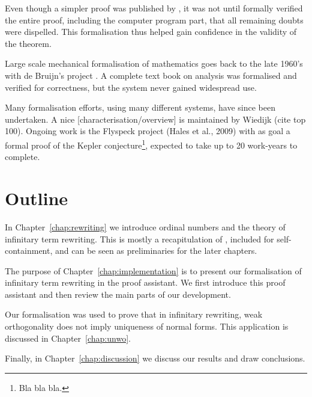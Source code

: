 Even though a simpler proof was published by \citet{robertson-97}, it
was not until \citet{gonthier-05} formally verified the entire proof,
including the computer program part, that all remaining doubts were
dispelled. This formalisation thus helped gain confidence in the
validity of the theorem.

Large scale mechanical formalisation of mathematics goes back to the
late 1960's with de Bruijn's \Automath project
\citep{nederpelt-94}. A complete text book on analysis
\citep{landau-65} was formalised and verified for correctness, but the
system never gained widespread use.

Many formalisation efforts, using many different systems, have since
been undertaken. A nice [characterisation/overview] is maintained by
Wiedijk (cite top 100). Ongoing work is the Flyspeck project (Hales et
al., 2009) with as goal a formal proof of the Kepler
conjecture\footnote{Bla bla bla.}, expected to take up to 20
work-years to complete.


\section*{Outline}

In Chapter~\ref{chap:rewriting} we introduce ordinal numbers and the
theory of infinitary term rewriting. This is mostly a recapitulation
of \citet{terese-03}, included for self-containment, and can be seen
as preliminaries for the later chapters.

The purpose of Chapter~\ref{chap:implementation} is to present our
formalisation of infinitary term rewriting in the \Coq proof
assistant. We first introduce this proof assistant and then review the
main parts of our development.

Our formalisation was used to prove that in infinitary rewriting, weak
orthogonality does not imply uniqueness of normal forms. This
application is discussed in Chapter~\ref{chap:unwo}.

Finally, in Chapter~\ref{chap:discussion} we discuss our results and
draw conclusions.
